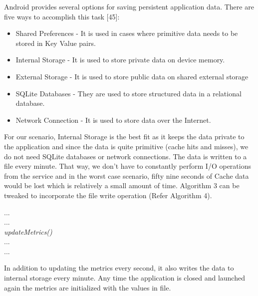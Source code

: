 \documentclass[12pt]{uthesis-v12}  %
\begin{document}
			Android provides several options for saving persistent application data. There are five ways to accomplish this task [45]:
			
			\begin{itemize}
				\item Shared Preferences - It is used in cases where primitive data needs to be stored in Key Value pairs.
				\item Internal Storage - It is used to store private data on device memory.
				\item External Storage - It is used to store public data on shared external storage
				\item SQLite Databases - They are used to store structured data in a relational database.
				\item Network Connection - It is used to store data over the Internet.
			\end{itemize}
			
			For our scenario, Internal Storage is the best fit as it keeps the data private to the application and since the data is quite primitive (cache hits and misses), we do not need SQLite databases or network connections. The data is written to a file every minute. That way, we don't have to constantly perform I/O operations from the service and in the worst case scenario, fifty nine seconds of Cache data would be lost which is relatively a small amount of time. Algorithm 3 can be tweaked to incorporate the file write operation (Refer Algorithm 4).
			
			\begin{algorithm}[H]
				\SetAlgoLined
				
				{	
					...\\
					...\\
					{\em updateMetrics()}\\
					...\\
					...\\	
				}
				
				\caption[Modified Update Metrics Algorithm]{In addition to updating the metrics every second, it also writes the data to internal storage every minute. Any time the application is closed and launched again the metrics are initialized with the values in file.}
			\end{algorithm}
			
\end{document}
